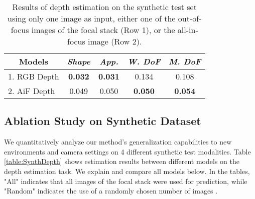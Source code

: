 \documentclass[10pt,twocolumn,letterpaper]{article}
\begin{document}
\begin{table*}[]
\begin{center}
{\begin{tabular}{l|c|c||c|c||c|c||cc}
\end{tabular}}
\end{center}
\vspace{-0.2cm}
\caption{Results on the synthetic data test sets for depth estimation models with focal stacks (FS) as input. {\it Row 1.} Direct depth prediction with a fixed-sized AE.  {\it Row 2.} Direct depth prediction with the proposed AE with global pooling. 
{\it Row 3.} Depth prediction for our method, using the predicted defocus map as supervisory signal.  }
\label{table:SynthDepth}
\end{table*} \begin{table}[]
\begin{center}
\begin{tabular}{l|cccc}
\hline
\multicolumn{1}{c|}{Models} & {\it Shape}      & {\it App.}       &  {\it W. DoF}          &  {\it M. DoF}        \\ \hline
1. RGB  Depth             & \textbf{0.032} & \textbf{0.031} & 0.134          & 0.108          \\ \hline
2. AiF  Depth             & 0.049          & 0.050          & \textbf{0.050} & \textbf{0.054} \\ \hline
\end{tabular}
\end{center}
\vspace{-0.2cm}
\caption{Results of depth estimation on the synthetic test set using only one image as input, either one of the out-of-focus images of the focal stack (Row 1), or the all-in-focus image (Row 2).}
\label{table:SynthDptOne}
\end{table} 



\subsection{Ablation Study on Synthetic Dataset}
We quantitatively analyze our method’s generalization capabilities to new environments and camera settings on 4 different synthetic test modalities.
Table \ref{table:SynthDepth} shows estimation results between different models on the depth estimation task.  
We explain and compare all models below.
In the tables, "All" indicates that all  images of the focal stack were used for prediction, while "Random" indicates the use of a randomly chosen number of images .
\end{document}
